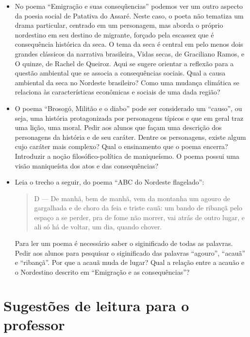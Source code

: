 \documentclass[11pt]{hedrabook_ficha}
\begin{document}
\begin{itemize}
\item No poema “Emigração e suas conseqûencias” podemos ver um outro aspecto da
  poesia social de Patativa do Assaré. Neste caso, o poeta não tematiza um
  drama particular, centrado em um personagem, mas aborda o próprio nordestino
  em seu destino de migrante, forçado pela escassez que é consequência
  histórica da seca. O tema da seca é central em pelo menos dois grandes
  clássicos da narrativa brasileira, Vidas secas, de Graciliano Ramos, e O
  quinze, de Rachel de Queiroz. Aqui se sugere orientar a reflexão para a
  questão ambiental que se associa a consequências sociais. Qual a causa
  ambiental da seca no Nordeste brasileiro? Como uma mudança climática se
  relaciona às características econômicas e sociais de uma dada região? 

\item O poema “Brosogó, Militão e o diabo” pode ser considerado um “causo”, ou
  seja, uma história protagonizada por personagens típicos e que em geral traz
  uma lição, uma moral. Pedir aos alunos que façam uma descrição dos
  personagens da história e de seu caráter. Dentre os personagens, existe algum
  cujo caráter mais complexo? Qual o ensinamento que o poema encerra?
  Introduzir a noção filosófico-política de maniqueísmo. O poema possui uma
  visão maniqueísta dos atos e das consequências?

\item Leia o trecho a seguir, do poema “ABC do Nordeste flagelado”:
\begin{quote}
D — De manhã, bem de manhã,
vem da montanha um agouro 
de gargalhada e de choro  da feia e triste cauã: 
um bando de ribançã  
pelo espaço a se perder,
pra de fome não morrer,
vai atrás de outro lugar,
e ali só há de voltar,
um dia, quando chover.
\end{quote}

Para ler um poema é necessário saber o siginificado de todas as palavras. Pedir
aos alunos para pesquisar o siginificado das palavras “agouro”, “acauã” e
“ribançã”. Por que a acauã muda de lugar? Qual a relação entre a acauão e o
Nordestino descrito em “Emigração e as consequências”? 

\end{itemize}

\section{Sugestões de leitura para o professor} 
\end{document}
